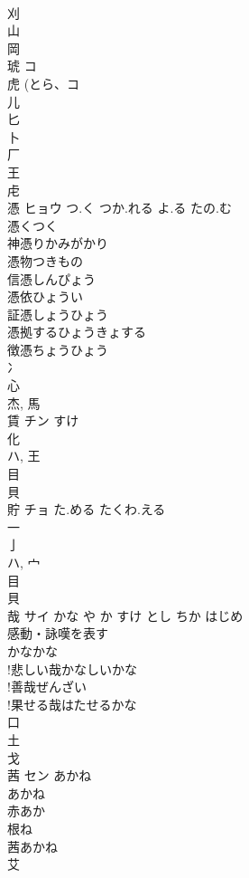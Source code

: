\documentclass[8pt]{extreport}
\begin{document}
\begin{CJK}{UTF8}{min}
\\	刈 
\\	山 
\\	岡 
\\	琥	コ		
\\	虎 (とら、コ 
\\	儿 
\\	匕 
\\	卜 
\\	厂 
\\	王 
\\	虍 
\\	憑	ヒョウ	つ.く つか.れる よ.る たの.む	
\\	憑くつく 
\\	神憑りかみがかり 
\\	憑物つきもの 
\\	信憑しんぴょう 
\\	憑依ひょうい 
\\	証憑しょうひょう 
\\	憑拠するひょうきょする 
\\	徴憑ちょうひょう 
\\	冫 
\\	心 
\\	杰, 馬 
\\	賃	チン	すけ	
\\	化 
\\	ハ, 王 
\\	目 
\\	貝 
\\	貯	チョ	た.める たくわ.える	
\\	一 
\\	亅 
\\	ハ, 宀 
\\	目 
\\	貝 
\\	哉	サイ	かな や か すけ とし ちか はじめ	
\\	感動・詠嘆を表す
\\	かなかな
\\	!悲しい哉かなしいかな
\\	!善哉ぜんざい
\\	!果せる哉はたせるかな
\\	口 
\\	土 
\\	戈 
\\	茜	セン	あかね	
\\	あかね 
\\	赤あか 
\\	根ね 
\\	茜あかね 
\\	艾 

\end{CJK}
\end{document}
